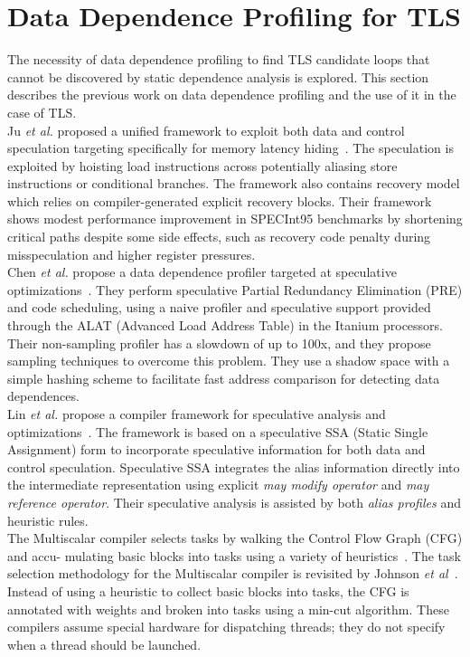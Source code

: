 \documentclass[10pt]{report}          %
\begin{document}
\section{Data Dependence Profiling for TLS}

The necessity of data dependence profiling to find TLS candidate loops that cannot be discovered by static dependence analysis is explored.  This section describes the previous work on data dependence profiling and the use of it in the case of TLS.\\
Ju \textit{et al.} proposed a unified framework to exploit both data and control speculation targeting specifically for memory latency hiding~\cite{ju_spec}. The speculation is exploited by hoisting load instructions across potentially aliasing store instructions or conditional branches.  The framework also contains recovery model which relies on compiler-generated explicit recovery blocks.  Their framework shows modest performance improvement in SPECInt95 benchmarks by shortening critical paths despite some side effects, such as recovery code penalty during misspeculation and higher register pressures.\\
Chen \textit{et al.} propose a data dependence profiler targeted at speculative optimizations~\cite{chen_spec}. They perform speculative Partial Redundancy Elimination (PRE) and code scheduling, using a naive profiler and speculative support provided through the ALAT (Advanced Load Address Table) in the Itanium processors. Their non-sampling profiler has a slowdown of up to 100x, and they propose sampling techniques to overcome this problem. They use a shadow space with a simple hashing scheme to facilitate fast address comparison for detecting data dependences.\\
Lin \textit{et al.} propose a compiler framework for speculative analysis and optimizations~\cite{lin_spec}.  The framework is based on a speculative SSA (Static Single Assignment) form to incorporate speculative information for both data and control speculation.  Speculative SSA integrates the alias information directly into the intermediate representation using explicit \textit{may modify operator} and \textit{may reference operator}. Their speculative analysis is assisted by both \textit{alias profiles} and heuristic rules.\\
The Multiscalar compiler selects tasks by walking the Control Flow Graph (CFG) and accu-
mulating basic blocks into tasks using a variety of heuristics~\cite{multiscalar}. The task selection methodology for the Multiscalar compiler is revisited by Johnson \textit{et al}~\cite{mincut}.  Instead of using a heuristic to collect basic blocks into tasks, the CFG is annotated with weights and broken into tasks using a min-cut algorithm. These compilers assume special hardware for dispatching threads; they do not specify when a thread should be launched.\\
\end{document}
